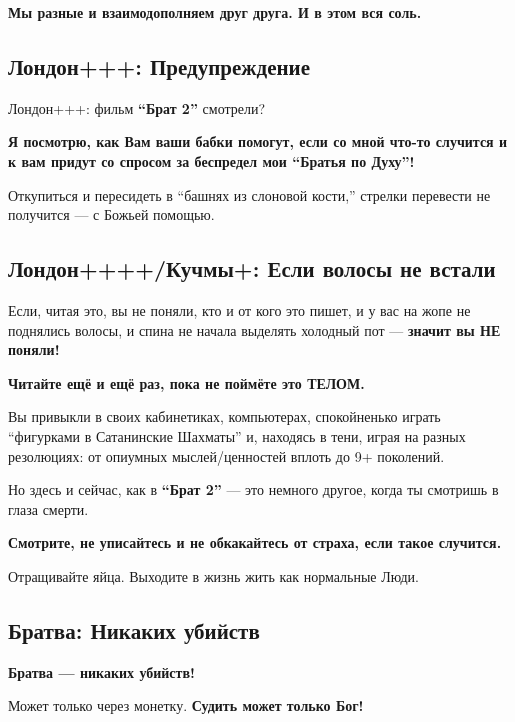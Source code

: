 \documentclass[11pt,a4paper]{article}
\theoremstyle{definition}
\theoremstyle{remark}
\begin{document}
\begin{tcolorbox}
{\textbf{Мы разные и взаимодополняем друг друга. И в этом вся соль.}

\vspace{0.8cm}

\subsection*{Лондон+++: Предупреждение}

Лондон+++: фильм \textbf{``Брат 2''} смотрели?

\textbf{Я посмотрю, как Вам ваши бабки помогут, если со мной что-то случится 
и к вам придут со спросом за беспредел мои ``Братья по Духу''!}

Откупиться и пересидеть в ``башнях из слоновой кости,'' стрелки перевести 
не получится — с Божьей помощью.

\vspace{0.8cm}

\subsection*{Лондон++++/Кучмы+: Если волосы не встали}

Если, читая это, вы не поняли, кто и от кого это пишет, и у вас на жопе не 
поднялись волосы, и спина не начала выделять холодный пот — \textbf{значит 
вы НЕ поняли!}

\textbf{Читайте ещё и ещё раз, пока не поймёте это ТЕЛОМ.}

Вы привыкли в своих кабинетиках, компьютерах, спокойненько играть ``фигурками 
в Сатанинские Шахматы'' и, находясь в тени, играя на разных резолюциях: от 
опиумных мыслей/ценностей вплоть до 9+ поколений.

Но здесь и сейчас, как в \textbf{``Брат 2''} — это немного другое, когда ты 
смотришь в глаза смерти.

\textbf{Смотрите, не уписайтесь и не обкакайтесь от страха, если такое случится.}

Отращивайте яйца. Выходите в жизнь жить как нормальные Люди.

\vspace{0.8cm}

\subsection*{Братва: Никаких убийств}

\textbf{Братва — никаких убийств!}

Может только через монетку. \textbf{Судить может только Бог!}

}
\end{tcolorbox}
\end{document}
